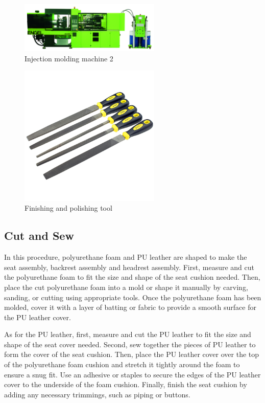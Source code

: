 \begin{figure}[!htp]
    \centering
    \includegraphics[width=0.6\textwidth]{images/Injection2.jpg}
    \caption{Injection molding machine 2}
    \label{fig: injection2}
\end{figure}

\begin{figure}
    \centering
    \includegraphics[width=0.6\textwidth]{images/cuodao.jpg}
    \caption{Finishing and polishing tool}
    \label{fig:cuodao}
\end{figure}

\subsection{Cut and Sew}
In this procedure, polyurethane foam and PU leather are shaped to make the seat assembly, backrest assembly and headrest assembly. First, measure and cut the polyurethane foam to fit the size and shape of the seat cushion needed. Then, place the cut polyurethane foam into a mold or shape it manually by carving, sanding, or cutting using appropriate tools. Once the polyurethane foam has been molded, cover it with a layer of batting or fabric to provide a smooth surface for the PU leather cover.

As for the PU leather, first, measure and cut the PU leather to fit the size and shape of the seat cover needed. Second, sew together the pieces of PU leather to form the cover of the seat cushion. Then, place the PU leather cover over the top of the polyurethane foam cushion and stretch it tightly around the foam to ensure a snug fit. Use an adhesive or staples to secure the edges of the PU leather cover to the underside of the foam cushion. Finally, finish the seat cushion by adding any necessary trimmings, such as piping or buttons.

